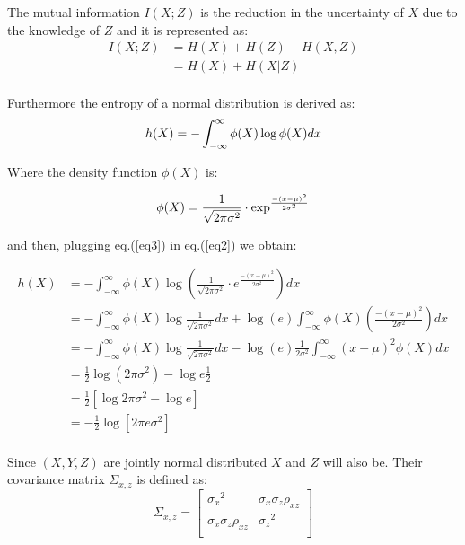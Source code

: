 \documentclass[11pt]{article}
\makeatletter
\newenvironment{proofw}{\par
	\pushQED{\qed}%
	\normalfont \topsep6\p@\@plus6\p@\relax
	\trivlist
	\item[]\ignorespaces
}{%
	\popQED\endtrivlist\@endpefalse
}
\makeatother
\begin{document}
\begin{proofw}
The mutual information $I(X;Z)$ is the reduction in the uncertainty of $X$ due to the knowledge of $Z$ and it is represented as:
\begin{equation}\label{eq2}
\begin{split}
I(X;Z) & = H(X) + H(Z) - H(X, Z)\\
       & = H(X) + H(X|Z)\\
\end{split}
\end{equation}

Furthermore the entropy of a normal distribution is derived as:
\begin{equation*}
h(X)  = -\int_{-\infty}^{\infty} \phi(X) \log \phi(X) dx\\
\end{equation*}

Where the density function $\phi(X)$ is:

\begin{equation}\label{eq3}
\phi(X) = \frac{1}{\sqrt{2\pi {\sigma}^2}} \cdot {\exp}^\frac{{-(x-\mu)}^2}{2 {\sigma}^2}\\
\end{equation}

and then, plugging eq.(\ref{eq3}) in eq.(\ref{eq2}) we obtain:

\begin{equation*}
\begin{split}
h(X)  &= -\int_{-\infty}^{\infty} \phi(X) \log (\frac{1}{\sqrt{2\pi {\sigma}^2}} \cdot {e}^\frac{{-(x-\mu)}^2}{2 {\sigma}^2}) dx\\
	  &= -\int_{-\infty}^{\infty} \phi(X) \log \frac{1}{\sqrt{2\pi {\sigma}^2}} dx + \log (e) \int_{-\infty}^{\infty} \phi(X)(\frac{{-(x-\mu)}^2}{2 {\sigma}^2})  dx  \\
	  &= -\int_{-\infty}^{\infty} \phi(X) \log \frac{1}{\sqrt{2\pi {\sigma}^2}} dx - \log (e) \frac{1}{2{\sigma}^2} \int_{-\infty}^{\infty} {(x-\mu)}^2 \phi(X)dx  \\
	  &= \frac{1}{2} \log (2\pi{\sigma}^2) - \log e \frac{1}{2}\\
	  &= \frac{1}{2} [\log 2\pi{\sigma}^2 - \log e]\\
	  &= -\frac{1}{2}\log[ 2\pi e {\sigma}^2]\\	  
\end{split}
\end{equation*}

Since $(X,Y,Z)$ are jointly normal distributed $X$ and $Z$ will also be. Their covariance matrix $\Sigma_{x,z}$ is defined as:
\[
\Sigma_{x,z} =
\begin{bmatrix}
{\sigma_{x}}^2 & \sigma_{x}\sigma_{z}\rho_{xz} \\
\sigma_{x}\sigma_{z}\rho_{xz} & {\sigma_{z}}^2\\
\end{bmatrix}
\]


\end{proofw}
\end{document}
